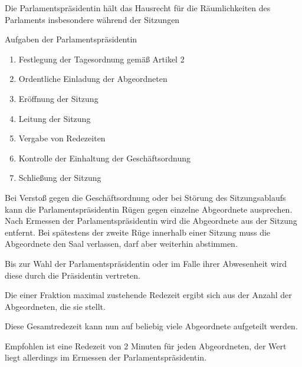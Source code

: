 \documentclass{sasbase}
\begin{document}
\begin{article}[Parlamentspräsidentin]
    \item Die Parlamentspräsidentin hält das Hausrecht für die Räumlichkeiten des Parlaments
        insbesondere während der Sitzungen
    \item Aufgaben der Parlamentspräsidentin
    \begin{enumerate}
        \item Festlegung der Tagesordnung gemäß Artikel 2
        \item Ordentliche Einladung der Abgeordneten
        \item Eröffnung der Sitzung
        \item Leitung der Sitzung
        \item Vergabe von Redezeiten
        \item Kontrolle der Einhaltung der Geschäftsordnung
        \item Schließung der Sitzung
    \end{enumerate}
    \item Bei Verstoß gegen die Geschäftsordnung oder bei Störung des Sitzungsablaufs kann die
        Parlamentspräsidentin Rügen gegen einzelne Abgeordnete ausprechen. Nach Ermessen der Parlamentspr\"{a}sidentin 
        wird die Abgeordnete aus der Sitzung entfernt. Bei spätestens der zweite Rüge
        innerhalb einer Sitzung muss die Abgeordnete den Saal verlassen, darf aber weiterhin abstimmen.
    \item Bis zur Wahl der Parlamentspräsidentin oder im Falle ihrer Abwesenheit wird diese durch
        die Präsidentin vertreten.
\end{article}

\begin{article}[Redezeiten]
    \item Die einer Fraktion maximal zustehende Redezeit ergibt sich aus der Anzahl der Abgeordneten, die sie stellt.
    \item Diese Gesamtredezeit kann nun auf beliebig viele Abgeordnete aufgeteilt werden.
    \item Empfohlen ist eine Redezeit von 2 Minuten f\"{u}r jeden Abgeordneten, der Wert liegt allerdings im Ermessen der Parlamentspr\"{a}sidentin.
\end{article}
    
\end{document}
